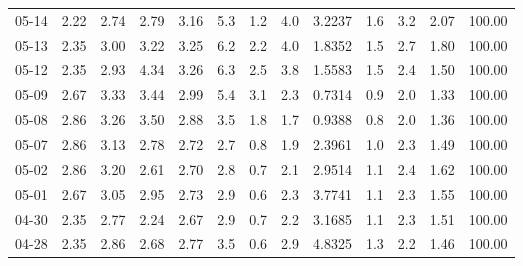 \begin{threeparttable}
{\begin{tabular}{lrrrrrrrrrrrr}
  05-14 &          2.22 &          2.74 &          2.79 &        3.16 &                 5.3 &                 1.2 &        4.0 &       3.2237 &                 1.6 &              3.2 &            2.07 &                 100.00 \\
  05-13 &          2.35 &          3.00 &          3.22 &        3.25 &                 6.2 &                 2.2 &        4.0 &       1.8352 &                 1.5 &              2.7 &            1.80 &                 100.00 \\
  05-12 &          2.35 &          2.93 &          4.34 &        3.26 &                 6.3 &                 2.5 &        3.8 &       1.5583 &                 1.5 &              2.4 &            1.50 &                 100.00 \\
  05-09 &          2.67 &          3.33 &          3.44 &        2.99 &                 5.4 &                 3.1 &        2.3 &       0.7314 &                 0.9 &              2.0 &            1.33 &                 100.00 \\
  05-08 &          2.86 &          3.26 &          3.50 &        2.88 &                 3.5 &                 1.8 &        1.7 &       0.9388 &                 0.8 &              2.0 &            1.36 &                 100.00 \\
  05-07 &          2.86 &          3.13 &          2.78 &        2.72 &                 2.7 &                 0.8 &        1.9 &       2.3961 &                 1.0 &              2.3 &            1.49 &                 100.00 \\
  05-02 &          2.86 &          3.20 &          2.61 &        2.70 &                 2.8 &                 0.7 &        2.1 &       2.9514 &                 1.1 &              2.4 &            1.62 &                 100.00 \\
  05-01 &          2.67 &          3.05 &          2.95 &        2.73 &                 2.9 &                 0.6 &        2.3 &       3.7741 &                 1.1 &              2.3 &            1.55 &                 100.00 \\
  04-30 &          2.35 &          2.77 &          2.24 &        2.67 &                 2.9 &                 0.7 &        2.2 &       3.1685 &                 1.1 &              2.3 &            1.51 &                 100.00 \\
  04-28 &          2.35 &          2.86 &          2.68 &        2.77 &                 3.5 &                 0.6 &        2.9 &       4.8325 &                 1.3 &              2.2 &            1.46 &                 100.00 \\

\end{tabular}}
\end{threeparttable}
